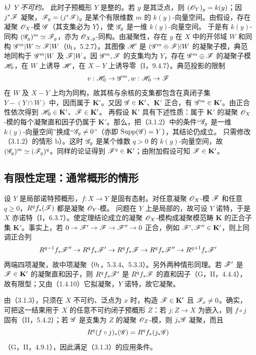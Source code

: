 \textit{b）$Y$ 不可约。} 此时子预概形 $Y$ 是整的。若 $y$ 是其泛点，则 $(\mathscr O_Y)_y=k(y)$；因 $j^*\mathscr F$ 凝聚，$\mathscr F_y=(j^*\mathscr F)_y$ 是某个有限维数 $m$ 的 $k(y)$-向量空间。由假设，存在凝聚 $\mathscr O_X$-模 $\mathscr G$（其支集必为 $Y$），使 $\mathscr G_y$ 是一维 $k(y)$-向量空间。
于是有 $k(y)$-同构 $(\mathscr G_y)^m\simeq\mathscr F_y$，亦为 $\mathscr O_{X,y}$-同构。由凝聚性，存在 $y$ 在 $X$ 中的开邻域 $W$ 和同构 $\mathscr G^m|W\simeq\mathscr F|W$（$0_{\mathrm I}$，5.2.7）。其图像 $\mathscr H$ 是 $(\mathscr G^m\oplus\mathscr F)|W$ 的凝聚子模，典范地同构于 $\mathscr G^m|W$ 及 $\mathscr F|W$。因 $\mathscr G^m,\mathscr F$ 的支集均为 $Y$，存在 $\mathscr G^m\oplus\mathscr F$ 的凝聚子模 $\mathscr H_0$，在 $W$ 上诱导 $\mathscr H$，在 $X-Y$ 上诱导零（I，9.4.7）。典范投影的限制
\[
v:\mathscr H_0\to\mathscr G^m, w:\mathscr H_0\to\mathscr F
\]
在 $W$ 及 $X-Y$ 上均为同构，故其核与余核的支集都包含在真闭子集 $Y-(Y\cap W)$ 中，因而属于 $\mathbf K'$。又因 $\mathscr G\in\mathbf K'$、$\mathbf K'$ 正合，有 $\mathscr G^m\in\mathbf K'$。由正合性依次得到 $\mathscr H_0\in\mathbf K'$、$\mathscr F\in\mathbf K'$。\finishproof
{}
再假设 $\mathbf K'$ 具有下述性质：属于 $\mathbf K'$ 的凝聚 $\mathscr O_X$-模的每个凝聚直和因子仍属于 $\mathbf K'$。那么，把（3.1.2）中的条件“$\mathscr G_y$ 是一维 $k(y)$-向量空间”换成“$\mathscr G_y\ne0$”（亦即 $\operatorname{Supp}(\mathscr G)=Y$），其结论仍成立。
\eproof
只需修改（3.1.2）的情形 b）。这时 $\mathscr G_y$ 是某个维数 $q>0$ 的 $k(y)$-向量空间，故 $(\mathscr G_y)^m\simeq(\mathscr F_y)^q$。同样的论证得到 $\mathscr F^q\in\mathbf K'$；由附加假设可知 $\mathscr F\in\mathbf K'$。\finishproof

\subsection{有限性定理：通常概形的情形}
设 $Y$ 是局部诺特预概形，$f:X\to Y$ 是固有态射。对任意凝聚 $\mathscr O_X$-模 $\mathscr F$ 和任意 $q\ge0$，$R^qf_*(\mathscr F)$ 都是凝聚 $\mathscr O_Y$-模。
\eproof
问题在 $Y$ 上是局部的，故可设 $Y$ 诺特，于是 $X$ 亦诺特（I，6.3.7）。使定理结论成立的凝聚 $\mathscr O_X$-模构成凝聚模范畴 $\mathbf K$ 的正合子集 $\mathbf K'$。事实上，若 $0\to\mathscr F'\to\mathscr F\to\mathscr F''\to0$ 正合，例如 $\mathscr F',\mathscr F''\in\mathbf K'$，则上同调正合列
\[
R^{q-1}f_*\mathscr F''\to R^qf_*\mathscr F'\to R^qf_*\mathscr F\to R^qf_*\mathscr F''\to R^{q+1}f_*\mathscr F'
\]
两端四项凝聚，故中项凝聚（$0_{\mathrm I}$，5.3.4、5.3.3）。另外两种情形同理。若 $\mathscr F'$ 是 $\mathscr F\in\mathbf K'$ 的凝聚直和因子，则 $R^qf_*\mathscr F'$ 是 $R^qf_*\mathscr F$ 的直和因子（G，II，4.4.4），故有限型；又由（1.4.10）它拟凝聚，$Y$ 诺特，故它凝聚。

由（3.1.3），只须在 $X$ 不可约、泛点为 $x$ 时，构造 $\mathscr F\in\mathbf K'$ 且 $\mathscr F_x\ne0$。确实，可把这一结果用于 $X$ 的任意不可约闭子预概形 $Z$：若 $j:Z\to X$ 为嵌入，则 $f\circ j$ 固有（II，5.4.2）；若 $\mathscr G$ 是支集为 $Z$ 的凝聚 $\mathscr O_Z$-模，则 $j_*\mathscr G$ 凝聚，而且
\[
R^q(f\circ j)_*(\mathscr G)=R^qf_*(j_*\mathscr G)
\]
（G，II，4.9.1），因此满足（3.1.3）的应用条件。

